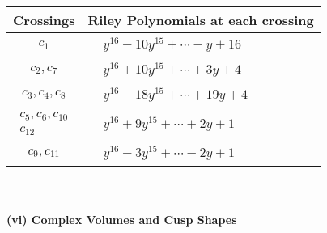 \documentclass[1p]{elsarticle_modified}
\theoremstyle{definition}
\begin{document}
\begin{tabular}{m{50pt}|m{274pt}}
Crossings & \hspace{64pt}Riley Polynomials at each crossing \\
\hline $$\begin{aligned}c_{1}\end{aligned}$$&$\begin{aligned}
&y^{16}-10 y^{15}+\cdots- y+16
\end{aligned}$\\
\hline $$\begin{aligned}c_{2},c_{7}\end{aligned}$$&$\begin{aligned}
&y^{16}+10 y^{15}+\cdots+3 y+4
\end{aligned}$\\
\hline $$\begin{aligned}c_{3},c_{4},c_{8}\end{aligned}$$&$\begin{aligned}
&y^{16}-18 y^{15}+\cdots+19 y+4
\end{aligned}$\\
\hline $$\begin{aligned}c_{5},c_{6},c_{10}\\c_{12}\end{aligned}$$&$\begin{aligned}
&y^{16}+9 y^{15}+\cdots+2 y+1
\end{aligned}$\\
\hline $$\begin{aligned}c_{9},c_{11}\end{aligned}$$&$\begin{aligned}
&y^{16}-3 y^{15}+\cdots-2 y+1
\end{aligned}$\\
\hline
\end{tabular}\\~\\
\newpage\flushleft \textbf{(vi) Complex Volumes and Cusp Shapes}
\end{document}
